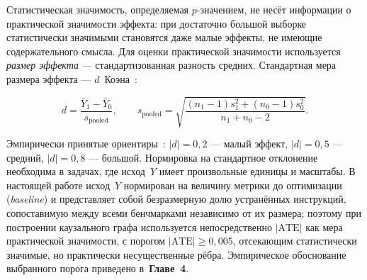 Статистическая значимость, определяемая $p$-значением, не несёт информации о практической значимости эффекта: при достаточно большой выборке статистически значимыми становятся даже малые эффекты, не имеющие содержательного смысла. Для оценки практической значимости используется \emph{размер эффекта} --- стандартизованная разность средних. Стандартная мера размера эффекта --- $d$~Коэна~\cite{cohen1988statistical}:

\begin{equation}
    d = \frac{\bar{Y}_1 - \bar{Y}_0}{s_{\text{pooled}}}, \qquad s_{\text{pooled}} = \sqrt{\frac{(n_1 - 1) s_1^2 + (n_0 - 1) s_0^2}{n_1 + n_0 - 2}}.
\end{equation}

Эмпирически принятые ориентиры~\cite{cohen1988statistical}: $|d| = 0{,}2$ --- малый эффект, $|d| = 0{,}5$ --- средний, $|d| = 0{,}8$ --- большой. Нормировка на стандартное отклонение необходима в задачах, где исход~$Y$ имеет произвольные единицы и масштабы. В настоящей работе исход~$Y$ нормирован на величину метрики до оптимизации (\emph{baseline}) и представляет собой безразмерную долю устранённых инструкций, сопоставимую между всеми бенчмарками независимо от их размера; поэтому при построении каузального графа используется непосредственно $|\mathrm{ATE}|$ как мера практической значимости, с порогом $|\mathrm{ATE}| \geqslant 0{,}005$, отсекающим статистически значимые, но практически несущественные рёбра. Эмпирическое обоснование выбранного порога приведено в~\textbf{Главе~4}.

\newpage
